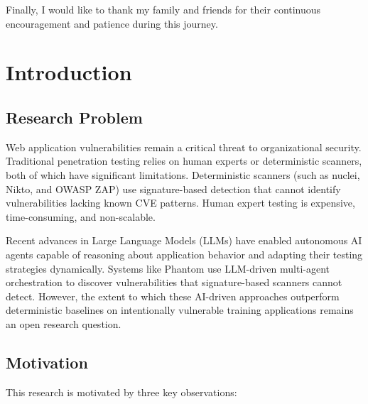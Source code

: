 \documentclass[12pt,a4paper,oneside]{book}
\begin{document}
Finally, I would like to thank my family and friends for their continuous encouragement and patience during this journey.

\cleardoublepage

\tableofcontents
\cleardoublepage

\listoftables
{}
\cleardoublepage

\listoffigures
{}
\cleardoublepage

\mainmatter
{}
\chapter{Introduction}

\section{Research Problem}

Web application vulnerabilities remain a critical threat to organizational security. Traditional penetration testing relies on human experts or deterministic scanners, both of which have significant limitations. Deterministic scanners (such as nuclei, Nikto, and OWASP ZAP) use signature-based detection that cannot identify vulnerabilities lacking known CVE patterns. Human expert testing is expensive, time-consuming, and non-scalable.

Recent advances in Large Language Models (LLMs) have enabled autonomous AI agents capable of reasoning about application behavior and adapting their testing strategies dynamically. Systems like Phantom use LLM-driven multi-agent orchestration to discover vulnerabilities that signature-based scanners cannot detect. However, the extent to which these AI-driven approaches outperform deterministic baselines on intentionally vulnerable training applications remains an open research question.

\section{Motivation}

This research is motivated by three key observations:
\end{document}
